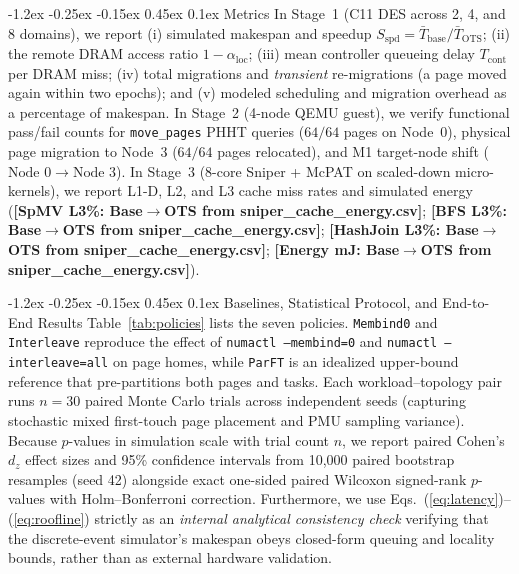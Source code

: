 \documentclass[10pt,twocolumn,letterpaper]{article}
\makeatletter
\renewcommand{\subsection}{\@startsection{subsection}{2}{\z@}%
  {-1.2ex \@plus -0.25ex \@minus -0.15ex}%
  {0.45ex \@plus 0.1ex}%
  {\normalfont\small\itshape}}
\newcommand{\sniperSpmvLthree}{\textbf{[SpMV L3\%: Base$\to$OTS from sniper\_cache\_energy.csv]}}
\newcommand{\sniperBfsLthree}{\textbf{[BFS L3\%: Base$\to$OTS from sniper\_cache\_energy.csv]}}
\newcommand{\sniperJoinLthree}{\textbf{[HashJoin L3\%: Base$\to$OTS from sniper\_cache\_energy.csv]}}
\newcommand{\sniperEnergySummary}{\textbf{[Energy mJ: Base$\to$OTS from sniper\_cache\_energy.csv]}}
\makeatother
\begin{document}
\subsection{Metrics}
In Stage~1 (C11 DES across 2, 4, and 8 domains), we report (i) simulated makespan and speedup $S_{\mathrm{spd}} = \bar{T}_{\mathrm{base}}/\bar{T}_{\mathrm{OTS}}$; (ii) the remote DRAM access ratio $1 - \alpha_{\mathrm{loc}}$; (iii) mean controller queueing delay $T_{\mathrm{cont}}$ per DRAM miss; (iv) total migrations and \emph{transient} re-migrations (a page moved again within two epochs); and (v) modeled scheduling and migration overhead as a percentage of makespan. In Stage~2 (4-node QEMU guest), we verify functional pass/fail counts for \texttt{move\_pages} PHHT queries ($64/64$ pages on Node~0), physical page migration to Node~3 ($64/64$ pages relocated), and M1 target-node shift ($\text{Node }0 \to \text{Node }3$). In Stage~3 (8-core Sniper + McPAT on scaled-down micro-kernels), we report L1-D, L2, and L3 cache miss rates and simulated energy (\sniperSpmvLthree{}; \sniperBfsLthree{}; \sniperJoinLthree{}; \sniperEnergySummary{}).

\subsection{Baselines, Statistical Protocol, and End-to-End Results}
Table~\ref{tab:policies} lists the seven policies. \texttt{Membind0} and \texttt{Interleave} reproduce the effect of \texttt{numactl --membind=0} and \texttt{numactl --interleave=all} on page homes, while \texttt{ParFT} is an idealized upper-bound reference that pre-partitions both pages and tasks. Each workload--topology pair runs $n = 30$ paired Monte Carlo trials across independent seeds (capturing stochastic mixed first-touch page placement and PMU sampling variance). Because $p$-values in simulation scale with trial count $n$, we report paired Cohen's $d_z$ effect sizes and 95\% confidence intervals from 10,000 paired bootstrap resamples (seed 42) alongside exact one-sided paired Wilcoxon signed-rank $p$-values with Holm--Bonferroni correction. Furthermore, we use Eqs.~(\ref{eq:latency})--(\ref{eq:roofline}) strictly as an \emph{internal analytical consistency check} verifying that the discrete-event simulator's makespan obeys closed-form queuing and locality bounds, rather than as external hardware validation.
\end{document}
